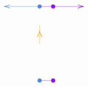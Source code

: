 \documentclass[12pt]{article}
\begin{document}
\[\begin{tikzpicture}[x=0.75pt,y=0.75pt,yscale=-1,xscale=1]
    \draw [shift={(119.98,199.6)}, rotate = 180] [color={rgb, 255:red, 74; green, 144; blue, 226 }  ,draw opacity=1 ][fill={rgb, 255:red, 74; green, 144; blue, 226 }  ,fill opacity=1 ][line width=0.75]      (0, 0) circle [x radius= 3.35, y radius= 3.35]   ;
    \draw [color={rgb, 255:red, 144; green, 19; blue, 254 }  ,draw opacity=1 ]   (119.98,199.6) -- (145.63,199.6) ;
    \draw [shift={(145.63,199.6)}, rotate = 0] [color={rgb, 255:red, 144; green, 19; blue, 254 }  ,draw opacity=1 ][fill={rgb, 255:red, 144; green, 19; blue, 254 }  ,fill opacity=1 ][line width=0.75]      (0, 0) circle [x radius= 3.35, y radius= 3.35]   ;
    \draw [color={rgb, 255:red, 144; green, 19; blue, 254 }  ,draw opacity=1 ]   (145.63,60.46) -- (201.55,60.46) ;
    \draw [shift={(203.55,60.46)}, rotate = 180] [color={rgb, 255:red, 144; green, 19; blue, 254 }  ,draw opacity=1 ][line width=0.75]    (10.93,-3.29) .. controls (6.95,-1.4) and (3.31,-0.3) .. (0,0) .. controls (3.31,0.3) and (6.95,1.4) .. (10.93,3.29)   ;
    \draw [color={rgb, 255:red, 74; green, 144; blue, 226 }  ,draw opacity=1 ]   (119.98,60.46) -- (54.75,60.46) ;
    \draw [shift={(52.75,60.46)}, rotate = 360] [color={rgb, 255:red, 74; green, 144; blue, 226 }  ,draw opacity=1 ][line width=0.75]    (10.93,-3.29) .. controls (6.95,-1.4) and (3.31,-0.3) .. (0,0) .. controls (3.31,0.3) and (6.95,1.4) .. (10.93,3.29)   ;
    \draw [shift={(119.98,60.46)}, rotate = 180] [color={rgb, 255:red, 74; green, 144; blue, 226 }  ,draw opacity=1 ][fill={rgb, 255:red, 74; green, 144; blue, 226 }  ,fill opacity=1 ][line width=0.75]      (0, 0) circle [x radius= 3.35, y radius= 3.35]   ;
    \draw [color={rgb, 255:red, 144; green, 19; blue, 254 }  ,draw opacity=1 ]   (119.98,60.46) -- (145.63,60.46) ;
    \draw [shift={(145.63,60.46)}, rotate = 0] [color={rgb, 255:red, 144; green, 19; blue, 254 }  ,draw opacity=1 ][fill={rgb, 255:red, 144; green, 19; blue, 254 }  ,fill opacity=1 ][line width=0.75]      (0, 0) circle [x radius= 3.35, y radius= 3.35]   ;
    \draw [color={rgb, 255:red, 245; green, 166; blue, 35 }  ,draw opacity=1 ]   (119.98,130.39) -- (120.15,95.86) ;
    \draw [shift={(120.1,107.13)}, rotate = 90.28] [color={rgb, 255:red, 245; green, 166; blue, 35 }  ,draw opacity=1 ][line width=0.75]    (10.93,-4.9) .. controls (6.95,-2.3) and (3.31,-0.67) .. (0,0) .. controls (3.31,0.67) and (6.95,2.3) .. (10.93,4.9)   ;

\end{tikzpicture}\]
\end{document}
